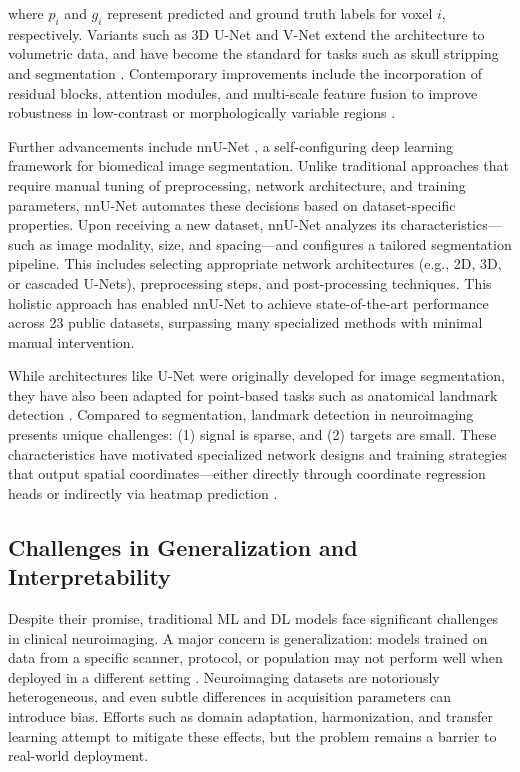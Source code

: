 where $p_i$ and $g_i$ represent predicted and ground truth labels for voxel $i$, respectively. Variants such as 3D U-Net \cite{Cicek2016-dz} and V-Net \cite{Milletari2016-ra} extend the architecture to volumetric data, and have become the standard for tasks such as skull stripping \cite{Hoopes2022-al} and segmentation \cite{Billot2023-tl, DeKraker2022-gj}. Contemporary improvements include the incorporation of residual blocks, attention modules, and multi-scale feature fusion to improve robustness in low-contrast or morphologically variable regions \cite{Oktay2018-rh}. 

Further advancements include nnU-Net \cite{Isensee2021-ev}, a self-configuring deep learning framework for biomedical image segmentation. Unlike traditional approaches that require manual tuning of preprocessing, network architecture, and training parameters, nnU-Net automates these decisions based on dataset-specific properties. Upon receiving a new dataset, nnU-Net analyzes its characteristics—such as image modality, size, and spacing—and configures a tailored segmentation pipeline. This includes selecting appropriate network architectures (e.g., 2D, 3D, or cascaded U-Nets), preprocessing steps, and post-processing techniques. This holistic approach has enabled nnU-Net to achieve state-of-the-art performance across 23 public datasets, surpassing many specialized methods with minimal manual intervention.

While architectures like U-Net were originally developed for image segmentation, they have also been adapted for point-based tasks such as anatomical landmark detection \cite{Ertl2025-wu,Chong2024-rp,Ye2023-wn}. Compared to segmentation, landmark detection in neuroimaging presents unique challenges: (1) signal is sparse, and (2) targets are small. These characteristics have motivated specialized network designs and training strategies that output spatial coordinates—either directly through coordinate regression heads \cite{Nibali2018-bu} or indirectly via heatmap prediction \cite{Payer2016-ik}.

\subsection{Challenges in Generalization and Interpretability}
Despite their promise, traditional ML and DL models face significant challenges in clinical neuroimaging. A major concern is generalization: models trained on data from a specific scanner, protocol, or population may not perform well when deployed in a different setting \cite{zech2018variable}. Neuroimaging datasets are notoriously heterogeneous, and even subtle differences in acquisition parameters can introduce bias. Efforts such as domain adaptation, harmonization, and transfer learning attempt to mitigate these effects, but the problem remains a barrier to real-world deployment.

